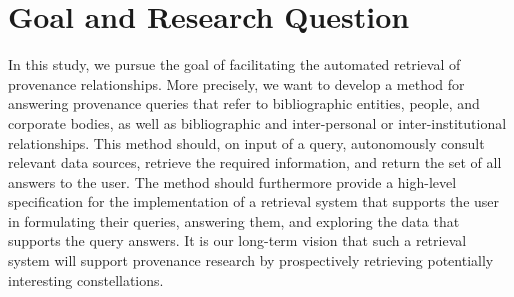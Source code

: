 \section{Goal and Research Question}
\label{sec:research_questions}

In this study, we pursue the goal of facilitating
the automated retrieval of provenance relationships.
More precisely,
we want to develop a method for answering provenance queries that refer to bibliographic entities, people, and corporate bodies,
as well as bibliographic and inter-personal or inter-institutional relationships.
This method should, on input of a query,
autonomously consult relevant data sources,
retrieve the required information, and return the set of all answers to the user.
The method should furthermore provide a high-level specification
for the implementation of a retrieval system
that supports the user in formulating their queries, answering them, and exploring the data that supports the query answers.
It is our long-term vision that such a retrieval system will support provenance research
by prospectively retrieving potentially interesting constellations.

%

